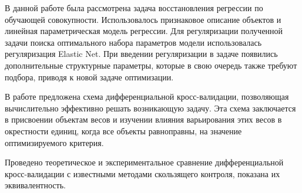 В данной работе была рассмотрена задача восстановления регрессии по обучающей совокупности. 
Использовалось признаковое описание объектов и линейная параметрическая модель регрессии. 
Для регуляризации полученной задачи поиска оптимального набора параметров модели использовалась регуляризация Elastic Net.
При введении регуляризации в задаче появились дополнительные структурные параметры, которые в свою очередь также требуют подбора, приводя к новой задаче оптимизации.

В работе предложена схема дифференциальной кросс-валидации, позволяющая вычислительно эффективно решать возникающую задачу.
Эта схема заключается в присвоении объектам весов и изучении влияния варьирования этих весов в окрестности единиц, когда все объекты равноправны, на значение оптимизируемого критерия.

Проведено теоретическое и экспериментальное сравнение дифференциальной кросс-валидации с известными методами скользящего контроля, показана их эквивалентность.